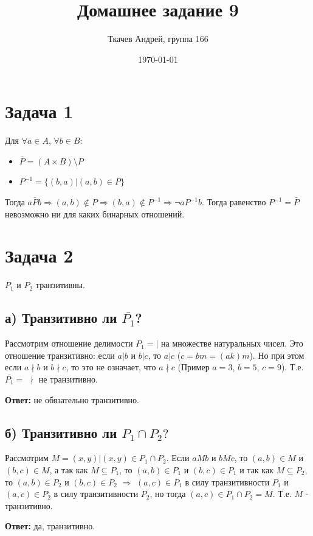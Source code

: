 \documentclass{article}
\title{Домашнее задание 9}
\author{Ткачев Андрей, группа 166}
\date{\today}
\begin{document}
	\maketitle
	\section {Задача 1}
		Для $\forall a \in A$, $ \forall b \in B$: 
		\begin{itemize}
			\item $\bar{P} = (A \times B) \setminus P$
			\item $P^{-1} = \{(b, a)| (a, b) \in P\}$ 
		\end{itemize}
	Тогда $a \bar{P} b \Rightarrow (a, b) \notin P \Rightarrow (b, a) \notin P^{-1} \Rightarrow \neg a P^{-1} b$. Тогда равенство $P^{-1} = \bar{P}$ невозможно ни для каких бинарных отношений.
	
	\section{Задача 2}
	$P_1$ и $P_2$ транзитивны.
	\subsection{а) Транзитивно ли $\bar{P_1}$?}
	
	Рассмотрим отношение делимости $P_1 = |$ на множестве натуральных чисел. Это отношение транзитивно: если $a | b$ и $b | c$, то $a | c$ ($c = bm = (ak)m$). Но при этом если $a \nmid b$ и $b \nmid c$, то это не означает, что $a \nmid c$ (Пример $a = 3$, $b = 5$, $c = 9$). Т.е. $\bar{P_1} =$ $\nmid$ не транзитивно.
	
	\textbf{Ответ:} не обязательно транзитивно. 
	
	\subsection{б) Транзитивно ли $P_1 \cap P_2?$}
	
	Рассмотрим $M = {(x, y) | (x, y) \in P_1 \cap P_2}$. Если $a M b$ и $b M c$, то  $(a, b) \in M$ и $(b, c) \in M$, а так как $M \subseteq P_1$, то $(a, b) \in P_1$ и $(b, c) \in P_1$ и так как  $M \subseteq P_2$, то $(a, b) \in P_2$ и $(b, c) \in P_2$ $\Rightarrow$ $(a, c) \in P_1$ в силу транзитивности $P_1$  и $(a, c) \in P_2$ в силу транзитивности $P_2$, но тогда $(a, c) \in P_1 \cap P_2 = M$. Т.е. $M$ - транзитивно.
	
	\textbf{Ответ:} да, транзитивно.
	
\end{document}
